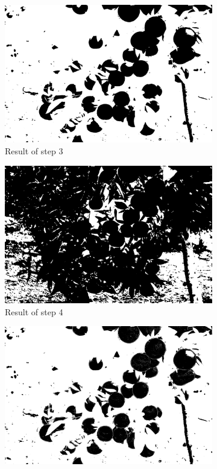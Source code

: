 \documentclass[conference]{IEEEtran}
\begin{document}
\begin{figure}[H]
  \begin{subfigure}{.3\linewidth}
  	\includegraphics[width=\linewidth]{citrus1/citrus1_cr.jpg}\hfill
     	\caption{Result of step 3}
  \end{subfigure}
  \begin{subfigure}{.3\linewidth}
  	\includegraphics[width=\linewidth]{citrus1/citrus1_cb.jpg}\hfill
     	\caption{Result of step 4}
  \end{subfigure}
  \begin{subfigure}{.3\linewidth}
  	\includegraphics[width=\linewidth]{citrus1/citrus1_mask.jpg}

\end{subfigure}
\end{figure}
\end{document}
